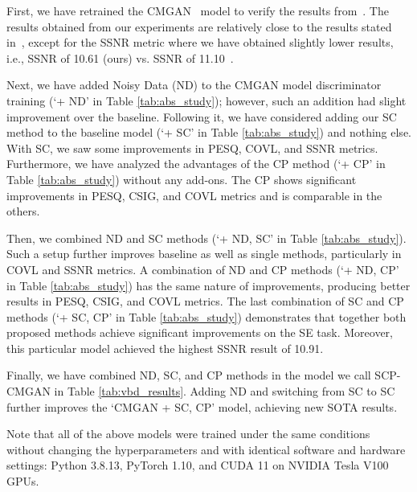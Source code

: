 \documentclass{article}
\begin{document}
First, we have retrained the CMGAN~\cite{cao2022cmgan} model to verify the results from~\cite{cao2022cmgan}. The results obtained from our experiments are relatively close to the results stated in~\cite{cao2022cmgan}, except for the SSNR metric where we have obtained slightly lower results, i.e., SSNR of 10.61 (ours) vs. SSNR of 11.10~\cite{cao2022cmgan}.

Next, we have added Noisy Data (ND) to the CMGAN model discriminator training (`+ ND' in Table \ref{tab:abs_study}); however, such an addition had slight improvement over the baseline. Following it, we have considered adding our SC method 
to the baseline model (`+ SC' in Table \ref{tab:abs_study}) and nothing else. 
With SC, we saw some improvements in PESQ, COVL, and SSNR metrics. Furthermore, we have analyzed the advantages of the CP method (`+ CP' in Table \ref{tab:abs_study}) without any add-ons. The CP shows significant improvements in PESQ, CSIG, and COVL metrics and is comparable in the others.

Then, we combined ND and SC methods (`+ ND, SC' in Table \ref{tab:abs_study}).
Such a setup further improves baseline as well as single methods, particularly in COVL and SSNR metrics. A combination of ND and CP methods (`+ ND, CP' in Table \ref{tab:abs_study}) has the same nature of improvements, producing better results in PESQ, CSIG, and COVL metrics. The last combination of SC and CP methods (`+ SC, CP' in Table \ref{tab:abs_study}) demonstrates that together both proposed methods achieve significant improvements on the SE task. Moreover, this particular model achieved the highest SSNR result of 10.91.

Finally, we have combined ND, SC, and CP methods in the model we call SCP-CMGAN in Table \ref{tab:vbd_results}. Adding ND and switching from SC to SC further improves the `CMGAN + SC, CP' model, achieving new SOTA results.


Note that all of the above models were trained under the same conditions without changing the hyperparameters and with identical software and hardware settings: Python 3.8.13, PyTorch 1.10, and CUDA 11 on NVIDIA Tesla V100 GPUs.
\end{document}
